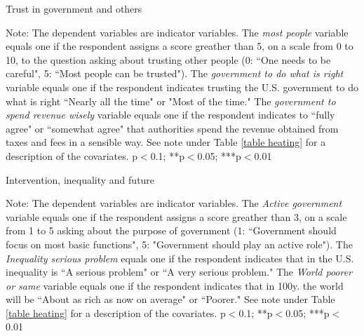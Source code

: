 \documentclass{article}
\begin{document}
\begin{table}[h!]
	\caption{Trust in government and others}
	\begin{center}
		\scalebox{0.7}{}
	\end{center}
	{\footnotesize Note: The dependent variables are indicator variables. The \textit{most people} variable equals one if the respondent assigns a score greather than 5, on a scale from 0 to 10, to the question asking about trusting other people (0: ``One needs to be careful", 5: ``Most people can be trusted"). The \textit{government to do what is right} variable equals one if the respondent indicates trusting the U.S. government to do what is right ``Nearly all the time" or "Most of the time." The \textit{government to spend revenue wisely} variable equals one if the respondent indicates to ``fully agree" or ``somewhat agree" that authorities spend the revenue obtained from taxes and fees in a sensible way.
	See note under Table \ref{table heating} for a description of the covariates.
		\newline *p$<$0.1; **p$<$0.05; ***p$<$0.01}	
\end{table}	

\begin{table}[h!]
	\caption{Intervention, inequality and future}
	\begin{center}
		\scalebox{0.7}{}
	\end{center}
	{\footnotesize Note: The dependent variables are indicator variables. The \textit{Active government} variable equals one if the respondent assigns a score greather than 3, on a scale from 1 to 5 asking about the purpose of government (1: ``Government should focus on most basic functions", 5: "Government should play an active role"). The \textit{Inequality serious problem} equals one if the respondent indicates that in the U.S. inequality is ``A serious problem" or ``A very serious problem." The \textit{World poorer or same} variable equals one if the respondent indicates that in 100y. the world will be ``About as rich as now on average" or ``Poorer."
	See note under Table \ref{table heating} for a description of the covariates.
	\newline *p$<$0.1; **p$<$0.05; ***p$<$0.01}
\end{table}	
\end{document}
